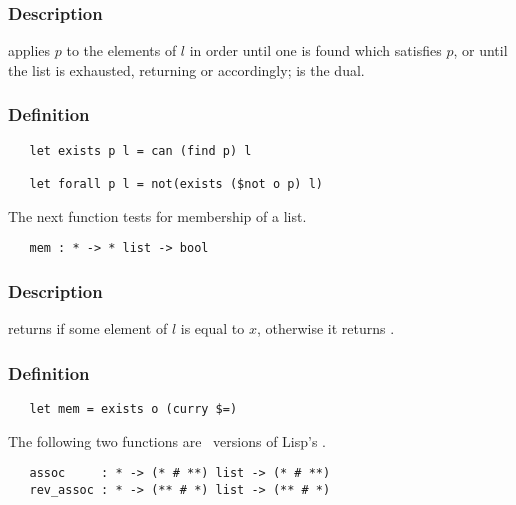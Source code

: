 \subsubsection*{Description}

 applies $p$ to the elements of $l$ in order until one is
found which satisfies $p$, or until the list is exhausted, returning  or
 accordingly;  is the dual.

\subsubsection*{Definition}

\begin{hol}\begin{verbatim}
   let exists p l = can (find p) l

   let forall p l = not(exists ($not o p) l)
\end{verbatim}\end{hol}


\noindent The next function tests for membership of a list.

\begin{boxed}
\begin{verbatim}
   mem : * -> * list -> bool
\end{verbatim}\end{boxed}

\subsubsection*{Description}

 returns  if some element of $l$ is equal to
$x$, otherwise it returns .

\subsubsection*{Definition}

\begin{hol}\begin{verbatim}
   let mem = exists o (curry $=)
\end{verbatim}\end{hol}


\noindent The following two functions are \ML\ versions of Lisp's .

\begin{boxed}
\begin{verbatim}
   assoc     : * -> (* # **) list -> (* # **)
   rev_assoc : * -> (** # *) list -> (** # *)
\end{verbatim}\end{boxed}

